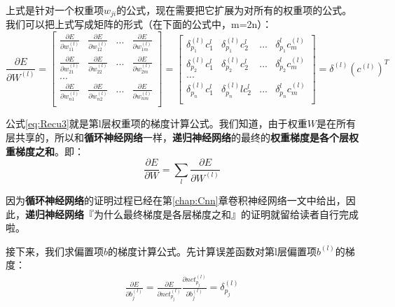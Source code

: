上式是针对一个权重项\(w_{ji}\)的公式，现在需要把它扩展为对所有的权重项的公式。我们可以把上式写成矩阵的形式（在下面的公式中，m=2n）：
\begin{equation}
	\label{eq:Recu3}
	\frac{\partial{E}}{\partial{W^{(l)}}}=
	\begin{bmatrix}
		\frac{\partial{E}}{\partial{w_{11}^{(l)}}} &
		\frac{\partial{E}}{\partial{w_{12}^{(l)}}} &
		...                                        &
		\frac{\partial{E}}{\partial{w_{1m}^{(l)}}}   \\
		\frac{\partial{E}}{\partial{w_{21}^{(l)}}} &
		\frac{\partial{E}}{\partial{w_{22}^{(l)}}} &
		...                                        &
		\frac{\partial{E}}{\partial{w_{2m}^{(l)}}}   \\
		...                                          \\
		\frac{\partial{E}}{\partial{w_{n1}^{(l)}}} &
		\frac{\partial{E}}{\partial{w_{n2}^{(l)}}} &
		...                                        &
		\frac{\partial{E}}{\partial{w_{nm}^{(l)}}}   \\
	\end{bmatrix}=
	\begin{bmatrix}
		\delta_{p_1}^{(l)}c_1^l & \delta_{p_1}^{(l)}c_2^l  & ... & \delta_{p_1}^lc_m^{(l)} \\
		\delta_{p_2}^{(l)}c_1^l & \delta_{p_2}^{(l)}c_2^l  & ... & \delta_{p_2}^lc_m^{(l)} \\
		...                                                                                \\
		\delta_{p_n}^{(l)}c_1^l & \delta_{p_n}^{(l)}lc_2^l & ... & \delta_{p_n}^lc_m^{(l)} \\
	\end{bmatrix}=\delta^{{(l)}}({c}^{(l)})^T
\end{equation}

公式\ref{eq:Recu3}就是第l层权重项的梯度计算公式。我们知道，由于权重\(W\)是在所有层共享的，所以和\textbf{循环神经网络}一样，\textbf{递归神经网络}的最终的\textbf{权重梯度是各个层权重梯度之和}。即：
\begin{equation}
	\label{eq:Recu4}
	\frac{\partial{E}}{\partial{W}}=\sum_l\frac{\partial{E}}{\partial{W^{(l)}}}
\end{equation}

因为\textbf{循环神经网络}的证明过程已经在第\ref{chap:Cnn}章卷积神经网络一文中给出，因此，\textbf{递归神经网络}『为什么最终梯度是各层梯度之和』的证明就留给读者自行完成啦。

接下来，我们求偏置项\({b}\)的梯度计算公式。先计算误差函数对第l层偏置项\({b}^{(l)}\)的梯度：
\begin{align*}
	\frac{\partial{E}}{\partial{b_j^{(l)}}}=\frac{\partial{E}}{\partial{{net}_{p_j}^{(l)}}}\frac{\partial{{net}_{p_j}^{(l)}}}{\partial{b_j^{(l)}}}=\delta_{p_j}^{(l)}
\end{align*}

